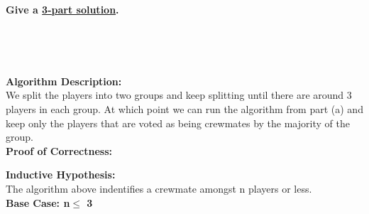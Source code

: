 \documentclass[11pt]{article}
\begin{document}
\begin{subparts}
	\textbf{Give a \href{https://cs170.org/resources/homework-guidelines/}{3-part solution}.}\\
    \begin{solution}\\
        \begin{center}
             \\
        \end{center}
        \textbf{Algorithm Description: }\\
        We split the players into two groups and keep splitting until there are around 3 players in each group. At which point we can run 
        the algorithm from part (a) and keep only the players that are voted as being crewmates by the majority of the group. \\
        \textbf{Proof of Correctness: }\\
        \begin{center}
            \textbf{Inductive Hypothesis: }\\
            The algorithm above indentifies a crewmate amongst n players or less.\\
            \textbf{Base Case: n$\le$ 3}\\

\end{center}
\end{solution}
\end{subparts}
\end{document}
